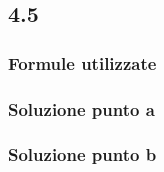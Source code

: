 \documentclass[../../main.tex]{subfiles}
\begin{document}
\subsection*{4.5}
\subsubsection*{Formule utilizzate}
\subsubsection*{Soluzione punto a}
\subsubsection*{Soluzione punto b}
\newpage
\end{document}
